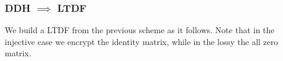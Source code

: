 \documentclass{beamer}
\begin{document}
\begin{frame}
    \frametitle{DDH $\implies$ LTDF}
    We build a LTDF from the previous scheme as it follows. Note
    that in the injective case we encrypt the identity matrix, while
    in the lossy the all zero matrix.
    \begin{center}
        \begin{pchstack}
            \begin{pcvstack}

                \pcvspace

            \end{pcvstack}
        \end{pchstack}
    \end{center}
\end{frame}
\end{document}
